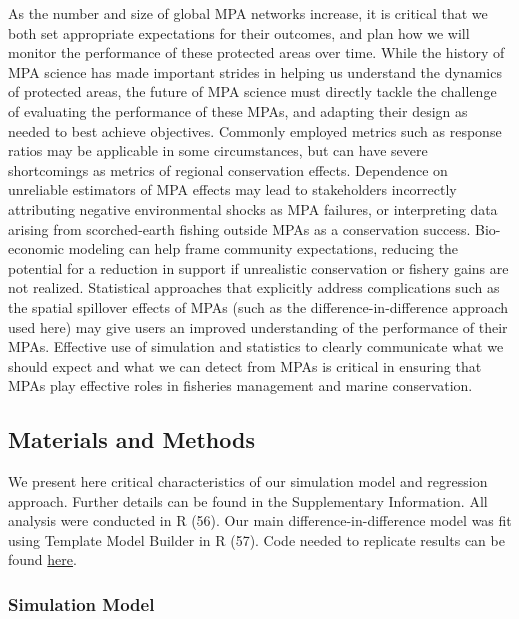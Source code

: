 \documentclass[9pt,twocolumn,twoside,lineno]{pnas-new}
\begin{document}
As the number and size of global MPA networks increase, it is critical
that we both set appropriate expectations for their outcomes, and plan
how we will monitor the performance of these protected areas over time.
While the history of MPA science has made important strides in helping
us understand the dynamics of protected areas, the future of MPA science
must directly tackle the challenge of evaluating the performance of
these MPAs, and adapting their design as needed to best achieve
objectives. Commonly employed metrics such as response ratios may be
applicable in some circumstances, but can have severe shortcomings as
metrics of regional conservation effects. Dependence on unreliable
estimators of MPA effects may lead to stakeholders incorrectly
attributing negative environmental shocks as MPA failures, or
interpreting data arising from scorched-earth fishing outside MPAs as a
conservation success. Bio-economic modeling can help frame community
expectations, reducing the potential for a reduction in support if
unrealistic conservation or fishery gains are not realized. Statistical
approaches that explicitly address complications such as the spatial
spillover effects of MPAs (such as the difference-in-difference approach
used here) may give users an improved understanding of the performance
of their MPAs. Effective use of simulation and statistics to clearly
communicate what we should expect and what we can detect from MPAs is
critical in ensuring that MPAs play effective roles in fisheries
management and marine conservation.

\hypertarget{materials-and-methods}{%
\subsection{Materials and Methods}\label{materials-and-methods}}

We present here critical characteristics of our simulation model and
regression approach. Further details can be found in the Supplementary
Information. All analysis were conducted in R (56). Our main
difference-in-difference model was fit using Template Model Builder in R
(57). Code needed to replicate results can be found
\href{https://github.com/DanOvando/regional-effects-of-mpas}{here}.

\hypertarget{simulation-model}{%
\subsubsection{Simulation Model}\label{simulation-model}}
\end{document}
